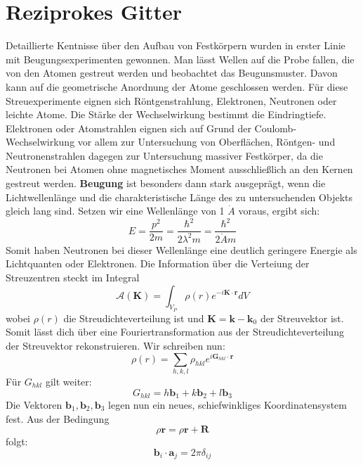 \documentclass[11pt]{article}
\begin{document}
\section{Reziprokes Gitter}
Detaillierte Kentnisse über den Aufbau von Festkörpern wurden in erster Linie
mit Beugungsexperimenten gewonnen. Man lässt Wellen auf die Probe fallen, die
von den Atomen gestreut werden und beobachtet das Beugunsmuster. Davon kann
auf die geometrische Anordnung der Atome geschlossen werden. Für diese
Streuexperimente eignen sich Röntgenstrahlung, Elektronen, Neutronen oder
leichte Atome. Die Stärke der Wechselwirkung bestimmt die Eindringtiefe.
Elektronen oder Atomstrahlen eignen sich auf Grund der Coulomb-Wechselwirkung
vor allem zur Untersuchung von Oberflächen, Röntgen- und Neutronenstrahlen
dagegen zur Untersuchung massiver Festkörper, da die Neutronen bei Atomen ohne
magnetisches Moment ausschließlich an den Kernen gestreut werden. \textbf{
Beugung} ist besonders dann stark ausgeprägt, wenn die Lichtwellenlänge und die
charakteristische Länge des zu untersuchenden Objekts gleich lang sind.
Setzen wir eine Wellenlänge von 1 $\dot{A}$ voraus, ergibt sich:
\begin{equation}
  E = \frac{p^2}{2m} = \frac{\hbar^2}{2\lambda^2m} = \frac{\hbar^2}{2
  \mathring{A}m}
\end{equation}
Somit haben Neutronen bei dieser Wellenlänge eine deutlich geringere Energie
als Lichtquanten oder Elektronen. Die Information über die Verteiung der
Streuzentren steckt im Integral
\begin{equation}
  \mathcal{A}(\bm{K})=\int_{V_P}\rho(r)e^{-i\bm{K}\cdot\bm{r}}dV
\end{equation}
wobei $\rho(r)$ die Streudichteverteilung ist und $\bm{K}=\bm{k}-\bm{k}_0$
der Streuvektor ist. Somit lässt dich über eine Fouriertransformation aus der
Streudichteverteilung der Streuvektor rekonstruieren. Wir schreiben nun:
\begin{equation}
  \rho(r)=\sum_{h,k,l}\rho_{hkl}e^{i\bm{G}_{hkl}\cdot\bm{r}}
\end{equation}
Für $G_{hkl}$ gilt weiter:
\begin{equation}
  G_{hkl}=h\bm{b}_1+k\bm{b}_2+l\bm{b}_3
\end{equation}
Die Vektoren $\bm{b}_1, \bm{b}_2, \bm{b}_3$ legen nun ein neues,
schiefwinkliges Koordinatensystem fest. Aus der Bedingung
\begin{equation}
  \rho{\bm{r}}=\rho{\bm{r}+\bm{R}}
\end{equation}
folgt:
\begin{equation}
  \bm{b}_i\cdot\bm{a}_j=2\pi\delta_{ij}
\end{equation}
\end{document}
